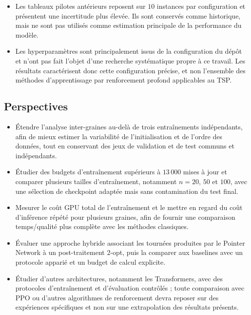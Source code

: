 \documentclass[12pt, a4paper, twoside, openright]{book}
\begin{document}
\begin{itemize}
\item Les tableaux pilotes antérieurs reposent sur $10$ instances par
configuration et présentent une incertitude plus élevée. Ils sont conservés
comme historique, mais ne sont pas utilisés comme estimation principale de
la performance du modèle.

\item Les hyperparamètres sont principalement issus de la configuration du
dépôt et n'ont pas fait l'objet d'une recherche systématique propre à ce
travail. Les résultats caractérisent donc cette configuration précise, et
non l'ensemble des méthodes d'apprentissage par renforcement profond
applicables au TSP.
\end{itemize}

\subsection{Perspectives}

\begin{itemize}
\item Étendre l'analyse inter-graines au-delà de trois entraînements
indépendants, afin de mieux estimer la variabilité de l'initialisation et de
l'ordre des données, tout en conservant des jeux de validation et de test
communs et indépendants.
\item Étudier des budgets d'entraînement supérieurs à $13\,000$ mises à jour
et comparer plusieurs tailles d'entraînement, notamment $n=20$, $50$ et
$100$, avec une sélection de checkpoint adaptée mais sans contamination du
test final.
\item Mesurer le coût GPU total de l'entraînement et le mettre en regard du
coût d'inférence répété pour plusieurs graines, afin de fournir une
comparaison temps/qualité plus complète avec les méthodes classiques.
\item Évaluer une approche hybride associant les tournées produites par le
Pointer Network à un post-traitement 2-opt, puis la comparer aux baselines
avec un protocole apparié et un budget de calcul explicite.
\item Étudier d'autres architectures, notamment les Transformers, avec des
protocoles d'entraînement et d'évaluation contrôlés ; toute comparaison avec
PPO ou d'autres algorithmes de renforcement devra reposer sur des expériences
spécifiques et non sur une extrapolation des résultats présents.
\end{itemize}

\end{document}
